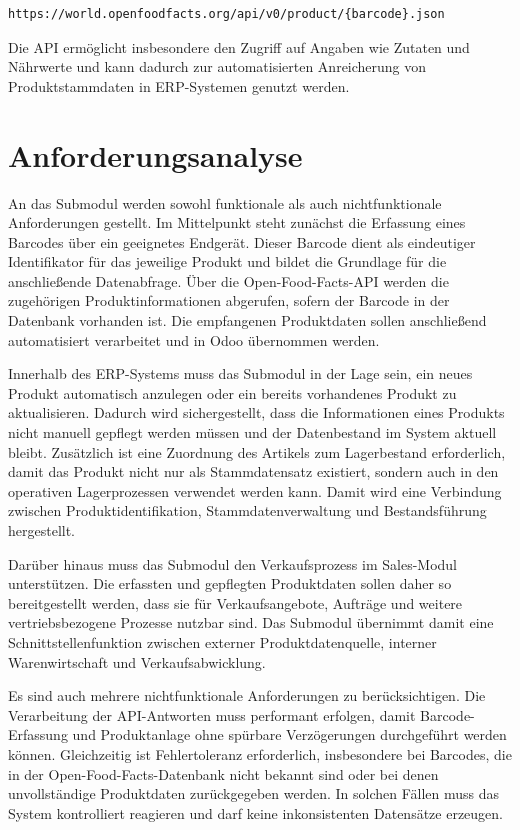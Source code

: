 \documentclass[12pt,a4paper]{article}
\begin{document}
\begin{lstlisting}[caption={API-Endpunkt für Produktabfragen über Barcode}]
https://world.openfoodfacts.org/api/v0/product/{barcode}.json
\end{lstlisting}

Die API ermöglicht insbesondere den Zugriff auf Angaben wie Zutaten und Nährwerte und kann dadurch zur automatisierten Anreicherung von Produktstammdaten in ERP-Systemen genutzt werden.

\section{Anforderungsanalyse}

An das Submodul werden sowohl funktionale als auch nichtfunktionale Anforderungen gestellt. Im Mittelpunkt steht zunächst die Erfassung eines Barcodes über ein geeignetes Endgerät. Dieser Barcode dient als eindeutiger Identifikator für das jeweilige Produkt und bildet die Grundlage für die anschließende Datenabfrage. Über die Open-Food-Facts-API werden die zugehörigen Produktinformationen abgerufen, sofern der Barcode in der Datenbank vorhanden ist. Die empfangenen Produktdaten sollen anschließend automatisiert verarbeitet und in Odoo übernommen werden.

Innerhalb des ERP-Systems muss das Submodul in der Lage sein, ein neues Produkt automatisch anzulegen oder ein bereits vorhandenes Produkt zu aktualisieren. Dadurch wird sichergestellt, dass die Informationen eines Produkts nicht manuell gepflegt werden müssen und der Datenbestand im System aktuell bleibt. Zusätzlich ist eine Zuordnung des Artikels zum Lagerbestand erforderlich, damit das Produkt nicht nur als Stammdatensatz existiert, sondern auch in den operativen Lagerprozessen verwendet werden kann. Damit wird eine Verbindung zwischen Produktidentifikation, Stammdatenverwaltung und Bestandsführung hergestellt.

Darüber hinaus muss das Submodul den Verkaufsprozess im Sales-Modul unterstützen. Die erfassten und gepflegten Produktdaten sollen daher so bereitgestellt werden, dass sie für Verkaufsangebote, Aufträge und weitere vertriebsbezogene Prozesse nutzbar sind. Das Submodul übernimmt damit eine Schnittstellenfunktion zwischen externer Produktdatenquelle, interner Warenwirtschaft und Verkaufsabwicklung.

Es sind auch mehrere nichtfunktionale Anforderungen zu berücksichtigen. Die Verarbeitung der API-Antworten muss performant erfolgen, damit Barcode-Erfassung und Produktanlage ohne spürbare Verzögerungen durchgeführt werden können. Gleichzeitig ist Fehlertoleranz erforderlich, insbesondere bei Barcodes, die in der Open-Food-Facts-Datenbank nicht bekannt sind oder bei denen unvollständige Produktdaten zurückgegeben werden. In solchen Fällen muss das System kontrolliert reagieren und darf keine inkonsistenten Datensätze erzeugen.
\end{document}
